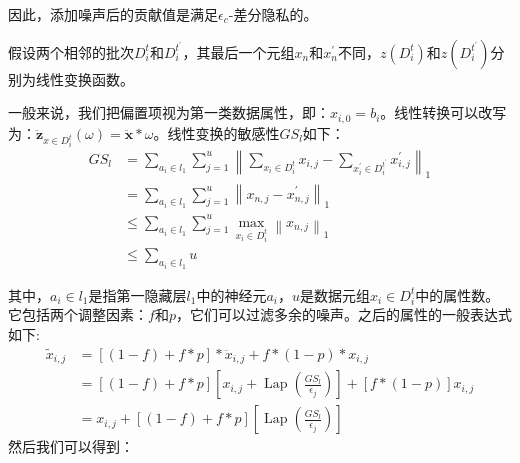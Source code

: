 因此，添加噪声后的贡献值是满足$\epsilon_{c}$-差分隐私的。

假设两个相邻的批次$D_{i}^{t}$和$D_{i}^{t^{\prime}}$，其最后一个元组$x_{n}$和$x_{n}^{\prime}$不同，$z\left(D_{i}^{t}\right)$和$z\left(D_{i}^{t^{\prime}}\right)$分别为线性变换函数。

一般来说，我们把偏置项视为第一类数据属性，即：$x_{i,0}=b_{i}$。线性转换可以改写为：$\ddot{\mathbf{z}}_{x \in D_{i}^{t}}(\omega)=\ddot{\mathbf{x}} * \omega$。线性变换的敏感性$G S_{l}$如下：
\begin{equation}
\begin{aligned}
G S_{l} &=\sum_{a_{i} \in l_{1}} \sum_{j=1}^{u}\left\|\sum_{x_{i} \in D_{i}^{t}} x_{i, j}-\sum_{x_{i}^{\prime} \in D_{i}^{t^{\prime}}} x_{i, j}^{\prime}\right\|_{1} \\
&=\sum_{a_{i} \in l_{1}} \sum_{j=1}^{u}\left\|x_{n, j}-x_{n, j}^{\prime}\right\|_{1} \\
& \leq \sum_{a_{i} \in l_{1}} \sum_{j=1}^{u} \max _{x_{i} \in D_{i}^{t}}\left\|x_{n, j}\right\|_{1} \\
& \leq \sum_{a_{i} \in l_{1}} u
\end{aligned}
\end{equation}

其中，$a_{i} \in l_{1}$是指第一隐藏层$l_{1}$中的神经元$a_{i}$，$u$是数据元组$x_{i} \in D_{i}^{t}$中的属性数。它包括两个调整因素：$f$和$p$，它们可以过滤多余的噪声。之后的属性的一般表达式如下:
\begin{equation}
\begin{aligned}
\tilde{x}_{i, j} &=[(1-f)+f * p] * \ddot{x}_{i, j}+f *(1-p) * x_{i, j} \\
&=[(1-f)+f * p]\left[x_{i, j}+\operatorname{Lap}\left(\frac{G S_{l}}{\epsilon_{j}}\right)\right]+[f *(1-p)] x_{i, j} \\
&=x_{i, j}+[(1-f)+f * p]\left[\operatorname{Lap}\left(\frac{G S_{l}}{\epsilon_{j}}\right)\right]
\end{aligned}
\end{equation}
然后我们可以得到：

